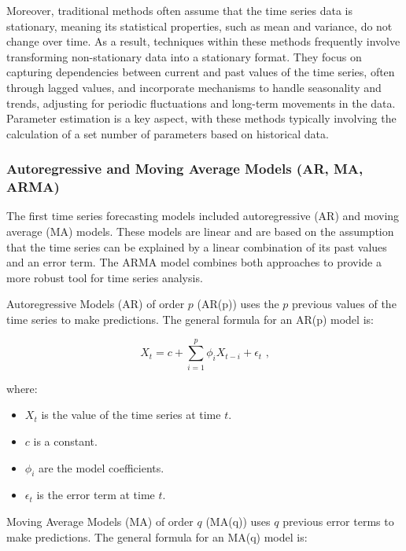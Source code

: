 Moreover, traditional methods often assume that the time series data is stationary, meaning its statistical properties, such as mean and variance, do not change over time. As a result, techniques within these methods frequently involve transforming non-stationary data into a stationary format. They focus on capturing dependencies between current and past values of the time series, often through lagged values, and incorporate mechanisms to handle seasonality and trends, adjusting for periodic fluctuations and long-term movements in the data. Parameter estimation is a key aspect, with these methods typically involving the calculation of a set number of parameters based on historical data.
\vspace{10pt}

\subsubsection{Autoregressive and Moving Average Models (AR, MA, ARMA)}

The first time series forecasting models included autoregressive (AR) and moving average (MA) models. These models are linear and are based on the assumption that the time series can be explained by a linear combination of its past values and an error term. The ARMA model combines both approaches to provide a more robust tool for time series analysis.

Autoregressive Models (AR) of order \( p \) (AR(p)) uses the \( p \) previous values of the time series to make predictions. The general formula for an AR(p) model is:

\begin{equation}
X_t = c + \sum_{i=1}^{p} \phi_i X_{t-i} + \epsilon_t \text{ ,}
\end{equation}

where:
\begin{itemize}
    \item \( X_t \) is the value of the time series at time \( t \).
    \item \( c \) is a constant.
    \item \( \phi_i \) are the model coefficients.
    \item \( \epsilon_t \) is the error term at time \( t \).
\end{itemize}

Moving Average Models (MA) of order \( q \) (MA(q)) uses \( q \) previous error terms to make predictions. The general formula for an MA(q) model is:

